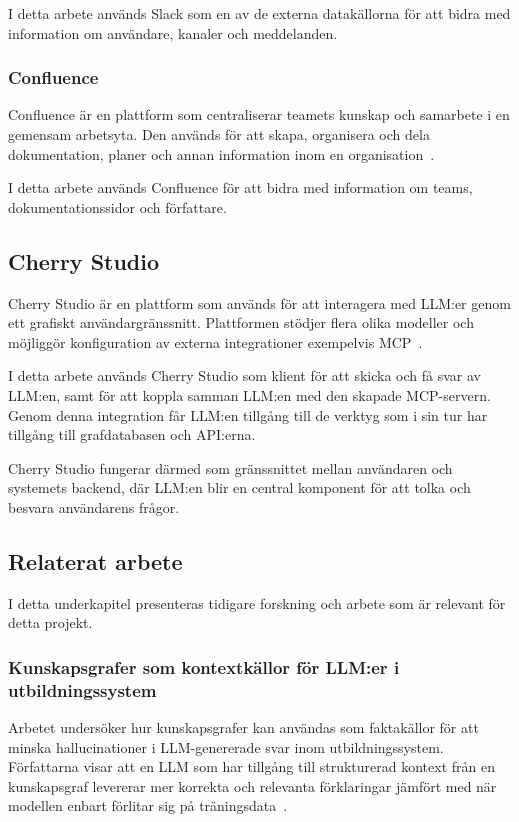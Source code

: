 I detta arbete används Slack som en av de externa datakällorna för att bidra med information om användare, kanaler och meddelanden.

\subsubsection{Confluence}\label{subsubsec:confluence}
Confluence är en plattform som centraliserar teamets kunskap och samarbete i en gemensam arbetsyta.
Den används för att skapa, organisera och dela dokumentation, planer och annan information inom en organisation~\cite{confluence}.

I detta arbete används Confluence för att bidra med information om teams, dokumentationssidor och författare.

\subsection{Cherry Studio}\label{subsec:CherryStudio}
Cherry Studio är en plattform som används för att interagera med LLM:er genom ett grafiskt användargränssnitt. Plattformen stödjer flera 
olika modeller och möjliggör konfiguration av externa integrationer exempelvis MCP~\cite{7}.

I detta arbete används Cherry Studio som klient för att skicka och få svar av LLM:en, samt för att koppla samman LLM:en med den skapade MCP-servern.
Genom denna integration får LLM:en tillgång till de verktyg som i sin tur har tillgång till grafdatabasen och API:erna.

Cherry Studio fungerar därmed som gränssnittet mellan användaren och systemets backend, där LLM:en blir en central komponent för att tolka och besvara användarens frågor.

\subsection{Relaterat arbete}

I detta underkapitel presenteras tidigare forskning och arbete som är relevant för detta projekt.

\subsubsection{Kunskapsgrafer som kontextkällor för LLM:er i utbildningssystem}

Arbetet undersöker hur kunskapsgrafer kan användas som faktakällor för att minska hallucinationer i LLM-genererade svar inom utbildningssystem.
Författarna visar att en LLM som har tillgång till strukturerad kontext från en kunskapsgraf levererar mer korrekta och relevanta förklaringar jämfört med när modellen enbart förlitar sig på träningsdata~\cite{relWork}.

